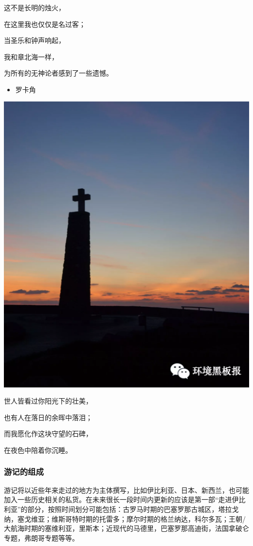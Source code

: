 \documentclass[]{book}
\providecommand{\tightlist}{%
  \setlength{\itemsep}{0pt}\setlength{\parskip}{0pt}}
\begin{document}
这不是长明的烛火，

在这里我也仅仅是名过客；

当圣乐和钟声响起，

我和章北海一样，

为所有的无神论者感到了一些遗憾。

\begin{itemize}
\tightlist
\item
  罗卡角
\end{itemize}

\includegraphics[width=7.17in]{images/xt2}

世人皆看过你阳光下的壮美，

也有人在落日的余晖中落泪；

而我愿化作这块守望的石碑，

在夜色中陪着你沉睡。

\subsubsection{游记的组成}

游记将以近些年来走过的地方为主体撰写，比如伊比利亚、日本、新西兰，也可能加入一些历史相关的私货。在未来很长一段时间内更新的应该是第一部``走进伊比利亚''的部分，按照时间划分可能包括：古罗马时期的巴塞罗那古城区，塔拉戈纳，塞戈维亚；维斯哥特时期的托雷多；摩尔时期的格兰纳达，科尔多瓦；王朝/大航海时期的塞维利亚，里斯本；近现代的马德里，巴塞罗那高迪街，法国拿破仑专题，弗朗哥专题等等。
\end{document}
